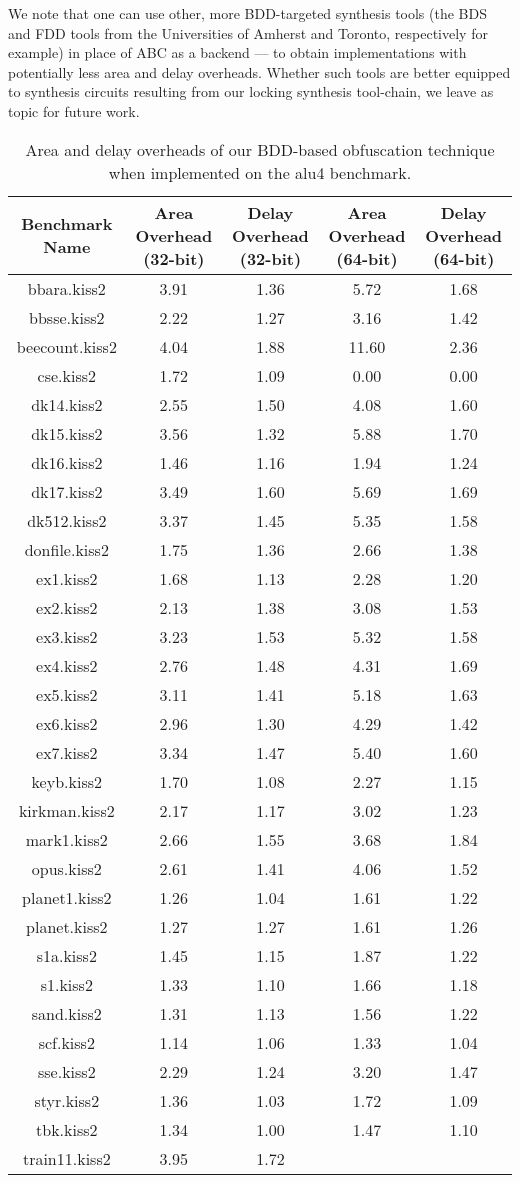 We note that one can use other, more BDD-targeted synthesis tools (the BDS and FDD tools from the Universities of Amherst and Toronto, respectively for example) in place of ABC as a backend --- to obtain implementations with potentially less area and delay overheads. Whether such tools are better equipped to synthesis circuits resulting from our locking synthesis tool-chain, we leave as topic for future work.

\begin{table*}
\caption{Area and delay overheads of our BDD-based obfuscation technique when implemented on the alu4 benchmark. }
\begin{tabular}{ | c | c | c | c | c | }
\hline
 Benchmark Name & Area Overhead (32-bit) & Delay Overhead (32-bit)  & Area Overhead (64-bit) & Delay Overhead (64-bit) \\
\hline
bbara.kiss2&3.91&1.36&5.72&1.68\\
bbsse.kiss2&2.22&1.27&3.16&1.42\\
beecount.kiss2&4.04&1.88&11.60&2.36\\
cse.kiss2&1.72&1.09&0.00&0.00\\
dk14.kiss2&2.55&1.50&4.08&1.60\\
dk15.kiss2&3.56&1.32&5.88&1.70\\
dk16.kiss2&1.46&1.16&1.94&1.24\\
dk17.kiss2&3.49&1.60&5.69&1.69\\
dk512.kiss2&3.37&1.45&5.35&1.58\\
donfile.kiss2&1.75&1.36&2.66&1.38\\
ex1.kiss2&1.68&1.13&2.28&1.20\\
ex2.kiss2&2.13&1.38&3.08&1.53\\
ex3.kiss2&3.23&1.53&5.32&1.58\\
ex4.kiss2&2.76&1.48&4.31&1.69\\
ex5.kiss2&3.11&1.41&5.18&1.63\\
ex6.kiss2&2.96&1.30&4.29&1.42\\
ex7.kiss2&3.34&1.47&5.40&1.60\\
keyb.kiss2&1.70&1.08&2.27&1.15\\
kirkman.kiss2&2.17&1.17&3.02&1.23\\
mark1.kiss2&2.66&1.55&3.68&1.84\\
opus.kiss2&2.61&1.41&4.06&1.52\\
planet1.kiss2&1.26&1.04&1.61&1.22\\
planet.kiss2&1.27&1.27&1.61&1.26\\
s1a.kiss2&1.45&1.15&1.87&1.22\\
s1.kiss2&1.33&1.10&1.66&1.18\\
sand.kiss2&1.31&1.13&1.56&1.22\\
scf.kiss2&1.14&1.06&1.33&1.04\\
sse.kiss2&2.29&1.24&3.20&1.47\\
styr.kiss2&1.36&1.03&1.72&1.09\\
tbk.kiss2&1.34&1.00&1.47&1.10\\
train11.kiss2&3.95&1.72&&\\
\hline
\end{tabular}
\end{table*}

